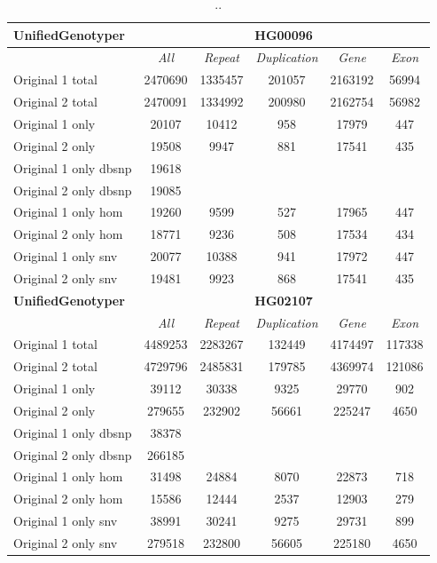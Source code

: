 \begin{table}[htb]
\begin{center}
\begin{tabular}{|l|c||c|c|c|c|}
\hline
{\bf UnifiedGenotyper} & \multicolumn{5}{|c|}{\bf HG00096} \\
\hline
\cline{2-6}
{\bf} & {\it All} & {\it Repeat} & {\it Duplication} & {\it Gene} & {\it Exon} \\
\hline
Original 1 total & 2470690 & 1335457 & 201057 & 2163192 & 56994\\ 
\hline
Original 2 total & 2470091 & 1334992 & 200980 & 2162754 & 56982\\ 
\hline
Original 1 only & 20107 & 10412 & 958 & 17979 & 447\\ 
\hline
Original 2 only & 19508 & 9947 & 881 & 17541 & 435\\ 
\hline
Original 1 only dbsnp & 19618 &  &  &  & \\ 
\hline
Original 2 only dbsnp & 19085 &  &  &  & \\ 
\hline
Original 1 only hom & 19260 & 9599 & 527 & 17965 & 447\\ 
\hline
Original 2 only hom & 18771 & 9236 & 508 & 17534 & 434\\ 
\hline
Original 1 only snv & 20077 & 10388 & 941 & 17972 & 447\\ 
\hline
Original 2 only snv & 19481 & 9923 & 868 & 17541 & 435\\ 
\hline
\hline
{\bf UnifiedGenotyper} & \multicolumn{5}{|c|}{\bf HG02107} \\
\hline
\cline{2-6}
{\bf} & {\it All} & {\it Repeat} & {\it Duplication} & {\it Gene} & {\it Exon} \\
\hline
Original 1 total & 4489253 & 2283267 & 132449 & 4174497 & 117338\\ 
\hline
Original 2 total & 4729796 & 2485831 & 179785 & 4369974 & 121086\\ 
\hline
Original 1 only & 39112 & 30338 & 9325 & 29770 & 902\\ 
\hline
Original 2 only & 279655 & 232902 & 56661 & 225247 & 4650\\ 
\hline
Original 1 only dbsnp & 38378 &  &  &  & \\ 
\hline
Original 2 only dbsnp & 266185 &  &  &  & \\ 
\hline
Original 1 only hom & 31498 & 24884 & 8070 & 22873 & 718\\ 
\hline
Original 2 only hom & 15586 & 12444 & 2537 & 12903 & 279\\ 
\hline
Original 1 only snv & 38991 & 30241 & 9275 & 29731 & 899\\ 
\hline
Original 2 only snv & 279518 & 232800 & 56605 & 225180 & 4650\\ 
\hline
\end{tabular}
\end{center}
\caption{ .. }
\label{tab:orig-vs-orig2-ug}
\end{table}

